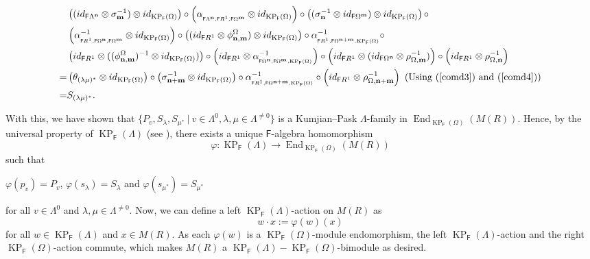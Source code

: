 \documentclass[12pt]{amsart}
\newcommand{\N}{\mathbf{n}}
\newcommand{\M}{\mathbf{m}}
\newcommand{\KP}{\operatorname{KP}}
\theoremstyle{definition}
\theoremstyle{remark}
\newcommand{\End}{\operatorname{End}}
\begin{document}
{\begin{align*}
    &\left((id_{\mathsf{F}\Lambda^\N}\otimes \sigma_\M^{-1})\otimes id_{\KP_\mathsf{F}(\Omega)}\right)\circ \left(\alpha_{_{\mathsf{F}\Lambda^\N,\mathsf{F}R^1,\mathsf{F}\Omega^\M}}\otimes id_{\KP_\mathsf{F}(\Omega)}\right)\circ \left((\sigma_\N^{-1}\otimes id_{\mathsf{F}\Omega^\M})\otimes id_{\KP_\mathsf{F}(\Omega)}\right)\circ\\
    &\left(\alpha_{_{\mathsf{F}R^1,\mathsf{F}\Omega^\N,\mathsf{F}\Omega^\M}}^{-1}\otimes id_{\KP_\mathsf{F}(\Omega)}\right)\circ \left((id_{\mathsf{F}R^1}\otimes \phi_{\N,\M}^\Omega)\otimes id_{\KP_\mathsf{F}(\Omega)}\right)\circ \alpha_{_{\mathsf{F}R^1,\mathsf{F}\Omega^{\N+\M},\KP_\mathsf{F}(\Omega)}}^{-1}\circ\\
    &\left(id_{\mathsf{F}R^1}\otimes ((\phi_{\N,\M}^\Omega)^{-1}\otimes id_{\KP_\mathsf{F}(\Omega)})\right)\circ \left(id_{\mathsf{F}R^1}\otimes \alpha_{_{\mathsf{F}\Omega^\N,\mathsf{F}\Omega^\M,\KP_\mathsf{F}(\Omega)}}^{-1}\right)\circ \left(id_{\mathsf{F}R^1}\otimes (id_{\mathsf{F}\Omega^\N}\otimes \rho_{\Omega,\M}^{-1})\right)\circ \left(id_{\mathsf{F}R^1}\otimes \rho_{\Omega,\N}^{-1}\right)\\
    =& \left(\theta_{(\lambda\mu)^*}\otimes id_{\KP_\mathsf{F}(\Omega)}\right)\circ \left(\sigma_{\N+\M}^{-1}\otimes id_{\KP_\mathsf{F}(\Omega)}\right)\circ \alpha_{_{\mathsf{F}R^1,\mathsf{F}\Omega^{\N+\M},\KP_\mathsf{F}(\Omega)}}^{-1}\circ \left(id_{\mathsf{F}R^1}\otimes \rho_{\Omega,\N+\M}^{-1}\right) ~\text{(Using (\ref{comd3}) and (\ref{comd4}))}\\
    =& S_{(\lambda\mu)^*}.
\end{align*}
}

With this, we have shown that $\{P_v,S_\lambda,S_{\mu^*}~|~v\in \Lambda^0,\lambda,\mu\in \Lambda^{\neq 0}\}$ is a Kumjian--Pask $\Lambda$-family in $\End_{\KP_\mathsf{F}(\Omega)}(M(R))$. Hence, by the universal property of $\KP_\mathsf{F}(\Lambda)$ (see \cite[Theorem 3.4]{Pino}), there exists a unique $\mathsf{F}$-algebra homomorphism \[\varphi:\KP_\mathsf{F}(\Lambda)\longrightarrow \End_{\KP_\mathsf{F}(\Omega)}(M(R))\] such that 
\begin{center}
    $\varphi(p_v)=P_v$, $\varphi(s_\lambda)=S_\lambda$ and $\varphi(s_{\mu^*})=S_{\mu^*}$
\end{center}
for all $v\in \Lambda^0$ and $\lambda,\mu\in \Lambda^{\neq 0}$. Now, we can define a left $\KP_\mathsf{F}(\Lambda)$-action on $M(R)$ as \[w\cdot x:=\varphi(w)(x)\] for all $w\in \KP_\mathsf{F}(\Lambda)$ and $x\in M(R)$. As each $\varphi(w)$ is a $\KP_\mathsf{F}(\Omega)$-module endomorphism, the left $\KP_\mathsf{F}(\Lambda)$-action and the right $\KP_\mathsf{F}(\Omega)$-action commute, which makes $M(R)$ a $\KP_\mathsf{F}(\Lambda)-\KP_\mathsf{F}(\Omega)$-bimodule as desired. 
\end{document}
